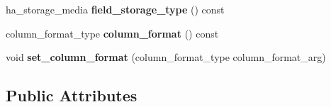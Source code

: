 \begin{DoxyCompactItemize}
\item 
\mbox{\label{classCreate__field_a1bb30356f9af1925bb09c4eceefa51d5}} 
ha\+\_\+storage\+\_\+media {\bfseries field\+\_\+storage\+\_\+type} () const
\item 
\mbox{\label{classCreate__field_ab27b0d10600bb7d3da605b16dc811fb3}} 
column\+\_\+format\+\_\+type {\bfseries column\+\_\+format} () const
\item 
\mbox{\label{classCreate__field_ae2c8f86dfc6ea5caa814a9512dcc554d}} 
void {\bfseries set\+\_\+column\+\_\+format} (column\+\_\+format\+\_\+type column\+\_\+format\+\_\+arg)
\end{DoxyCompactItemize}
\subsection*{Public Attributes}
